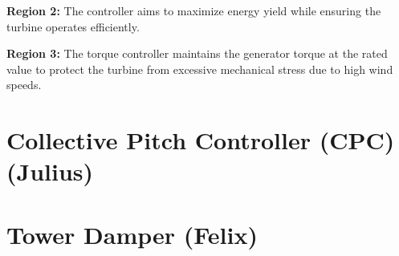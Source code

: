 \textbf{Region 2:} The controller aims to maximize energy yield while ensuring the turbine operates efficiently.

\textbf{Region 3:} The torque controller maintains the generator torque at the rated value to protect the turbine from excessive mechanical stress due to high wind speeds.

\section{Collective Pitch Controller (CPC) (Julius)}


\section{Tower Damper (Felix)}

